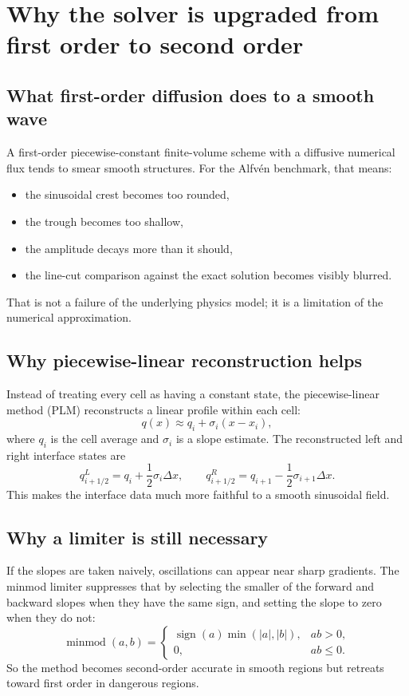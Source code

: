 \documentclass[11pt]{article}
\begin{document}
\section{Why the solver is upgraded from first order to second order}

\subsection{What first-order diffusion does to a smooth wave}
A first-order piecewise-constant finite-volume scheme with a diffusive numerical flux tends to smear smooth structures. For the Alfv\'en benchmark, that means:
\begin{itemize}[leftmargin=1.8em]
    \item the sinusoidal crest becomes too rounded,
    \item the trough becomes too shallow,
    \item the amplitude decays more than it should,
    \item the line-cut comparison against the exact solution becomes visibly blurred.
\end{itemize}
That is not a failure of the underlying physics model; it is a limitation of the numerical approximation.

\subsection{Why piecewise-linear reconstruction helps}
Instead of treating every cell as having a constant state, the piecewise-linear method (PLM) reconstructs a linear profile within each cell:
\begin{equation}
q(x) \approx q_i + \sigma_i (x-x_i),
\label{eq:m2-plm}
\end{equation}
where $q_i$ is the cell average and $\sigma_i$ is a slope estimate. The reconstructed left and right interface states are
\begin{equation}
q_{i+1/2}^{L}=q_i+\frac12 \sigma_i \Delta x,
\qquad
q_{i+1/2}^{R}=q_{i+1}-\frac12 \sigma_{i+1}\Delta x.
\label{eq:m2-plm-interfaces}
\end{equation}
This makes the interface data much more faithful to a smooth sinusoidal field.

\subsection{Why a limiter is still necessary}
If the slopes are taken naively, oscillations can appear near sharp gradients. The minmod limiter suppresses that by selecting the smaller of the forward and backward slopes when they have the same sign, and setting the slope to zero when they do not:
\begin{equation}
\operatorname{minmod}(a,b)
=
\begin{cases}
\operatorname{sign}(a)\min(|a|,|b|), & ab>0,\\
0, & ab\le 0.
\end{cases}
\label{eq:m2-minmod}
\end{equation}
So the method becomes second-order accurate in smooth regions but retreats toward first order in dangerous regions.
\end{document}
